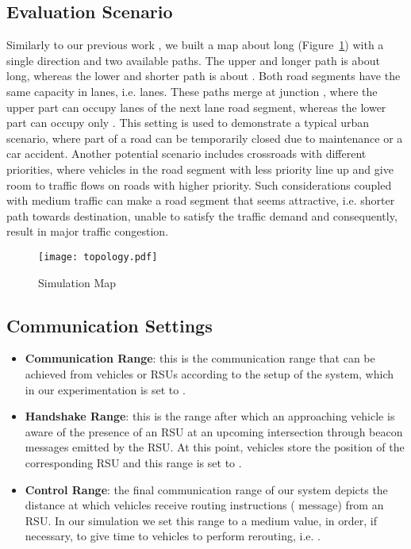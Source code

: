 \documentclass[conference]{IEEEtran}
\begin{document}
\subsection{Evaluation Scenario}
Similarly to our previous work \cite{maglaras2013exploiting}, we built a map about  long (Figure~\ref{map}) with a single direction and two available paths. The upper and longer path is about  long, whereas the lower and shorter path is about . Both road segments have the same capacity in lanes, i.e.  lanes. These paths merge at junction , where the upper part can occupy  lanes of the next  lane road segment, whereas the lower part can occupy only . This setting is used to demonstrate a typical urban scenario, where part of a road can be temporarily closed due to maintenance or a car accident. Another potential scenario includes crossroads with different priorities, where vehicles in the road segment with less priority line up and give room to traffic flows on roads with higher priority. Such considerations coupled with medium traffic can make a road segment that seems attractive, i.e. shorter path towards destination, unable to satisfy the traffic demand and consequently, result in major traffic congestion. 

\begin{figure}[b]
  \centering
     \texttt{[image: topology.pdf]}
  \caption{Simulation Map}
  \label{map}
\end{figure}

\subsection{Communication Settings}

\begin{itemize}
\item {\bf Communication Range}: this is the communication range that can be achieved from vehicles or RSUs according to the setup of the system, which in our experimentation is set to .
\item {\bf Handshake Range}: this is the range after which an approaching vehicle is aware of the presence of an RSU at an upcoming intersection through beacon
messages emitted by the RSU. At this point, vehicles store the position of the corresponding RSU and this range is set to .
\item {\bf Control Range}: the final communication range of our system depicts the distance at which vehicles receive routing instructions ( message) from an RSU.
In our simulation we set this range to a medium value, in order, if necessary, to give time to vehicles to perform rerouting, i.e. .
\end{itemize}
\end{document}
